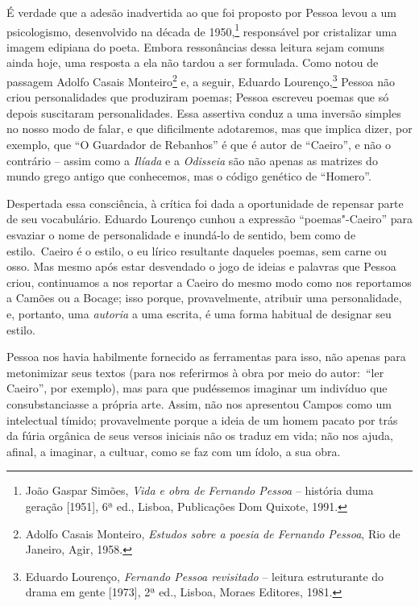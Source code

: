 É verdade que a adesão inadvertida ao que foi proposto por Pessoa levou
a um psicologismo, desenvolvido na década de 1950,\footnote{João Gaspar
  Simões, \emph{Vida e obra de Fernando Pessoa} -- história duma
  geração [1951], 6ª ed., Lisboa, Publicações Dom Quixote, 1991.}
responsável por cristalizar uma imagem edipiana do poeta. Embora
ressonâncias dessa leitura sejam comuns ainda hoje, uma resposta a ela
não tardou a ser formulada. Como notou de passagem Adolfo Casais
Monteiro\footnote{Adolfo Casais Monteiro, \emph{Estudos sobre a poesia
  de Fernando Pessoa}, Rio de Janeiro, Agir, 1958.} e, a seguir, Eduardo
Lourenço,\footnote{Eduardo Lourenço, \emph{Fernando Pessoa revisitado} -- leitura estruturante do drama em gente [1973], 2ª ed., Lisboa, Moraes Editores, 1981.} Pessoa não criou personalidades que
produziram poemas; Pessoa escreveu poemas que só depois suscitaram
personalidades. Essa assertiva conduz a uma inversão simples no nosso
modo de falar, e que dificilmente adotaremos, mas que implica dizer, por
exemplo, que ``O Guardador de Rebanhos'' é que é autor de ``Caeiro'', e
não o contrário -- assim como a \emph{Ilíada} e a \emph{Odisseia} são
não apenas as matrizes do mundo grego antigo que conhecemos, mas o
código genético de ``Homero''.

Despertada essa consciência, à crítica foi dada a oportunidade de
repensar parte de seu vocabulário. Eduardo Lourenço cunhou a expressão
``poemas"-Caeiro'' para esvaziar o nome de personalidade e inundá-lo de
sentido, bem como de estilo.~Caeiro é o estilo, o eu lírico resultante
daqueles poemas, sem carne ou osso. Mas mesmo após estar desvendado o
jogo de ideias e palavras que Pessoa criou, continuamos a nos reportar a
Caeiro do mesmo modo como nos reportamos a Camões ou a Bocage; isso porque, provavelmente, atribuir uma personalidade, e, portanto, uma
\emph{autoria} a uma escrita, é uma forma habitual de designar seu
estilo.

Pessoa nos havia habilmente fornecido as ferramentas para isso, não
apenas para metonimizar seus textos (para nos referirmos à obra por meio
do autor:~``ler Caeiro'', por exemplo), mas para que pudéssemos imaginar
um indivíduo que consubstanciasse a própria arte. Assim, não nos
apresentou Campos como um intelectual tímido; provavelmente porque a
ideia de um homem pacato por trás da fúria orgânica de seus versos
iniciais não os traduz em vida; não nos ajuda, afinal, a imaginar, a
cultuar, como se faz com um ídolo, a sua obra.

